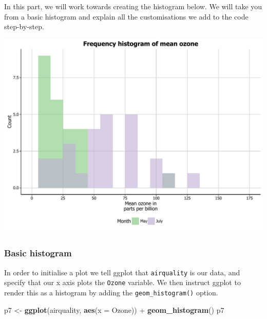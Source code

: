 \documentclass[]{article}
\newenvironment{Shaded}{\begin{snugshade}}{\end{snugshade}}
\newcommand{\KeywordTok}[1]{\textcolor[rgb]{0.13,0.29,0.53}{\textbf{{#1}}}}
\newcommand{\DataTypeTok}[1]{\textcolor[rgb]{0.13,0.29,0.53}{{#1}}}
\newcommand{\StringTok}[1]{\textcolor[rgb]{0.31,0.60,0.02}{{#1}}}
\newcommand{\NormalTok}[1]{{#1}}
\begin{document}
In this part, we will work towards creating the histogram below. We will
take you from a basic histogram and explain all the customisations we
add to the code step-by-step.

\begin{center}\includegraphics{0_all_posts_pdf/histogram_final-1} \end{center}

\subsubsection{Basic histogram}\label{basic-histogram}

In order to initialise a plot we tell ggplot that \texttt{airquality} is
our data, and specify that our x axis plots the \texttt{Ozone} variable.
We then instruct ggplot to render this as a histogram by adding the
\texttt{geom\_histogram()} option.

\begin{Shaded}
\begin{Highlighting}[]
\NormalTok{p7 <-}\StringTok{ }\KeywordTok{ggplot}\NormalTok{(airquality, }\KeywordTok{aes}\NormalTok{(}\DataTypeTok{x =} \NormalTok{Ozone)) +}\StringTok{ }\KeywordTok{geom_histogram}\NormalTok{()}
\NormalTok{p7}
\end{Highlighting}
\end{Shaded}
\end{document}
